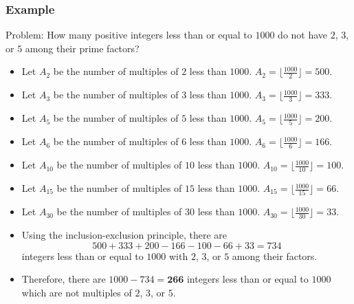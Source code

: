 \documentclass{beamer}
\begin{document}
\begin{frame}%
\frametitle{Example}

\scriptsize

\begin{mdframed}[style=exampledefault]
Problem: How many positive integers less than or equal to $1000$ do not have $2$, $3$, or $5$ among their
prime factors?
\end{mdframed}

\begin{itemize}

\item<2-> Let $A_2$ be the number of multiples of $2$ less than $1000$. $A_2 = \lfloor\frac{1000}{2}\rfloor = 500$.

\item<3-> Let $A_3$ be the number of multiples of $3$ less than $1000$. $A_3 = \lfloor\frac{1000}{3}\rfloor = 333$.

\item<4-> Let $A_5$ be the number of multiples of $5$ less than $1000$. $A_5 = \lfloor\frac{1000}{5}\rfloor = 200$.

\item<5-> Let $A_{6}$ be the number of multiples of $6$ less than $1000$. $A_6 = \lfloor\frac{1000}{6}\rfloor = 166$.

\item<6-> Let $A_{10}$ be the number of multiples of $10$ less than $1000$. $A_{10} = \lfloor\frac{1000}{10}\rfloor = 100$.

\item<7-> Let $A_{15}$ be the number of multiples of $15$ less than $1000$. $A_{15} = \lfloor\frac{1000}{15}\rfloor = 66$.

\item<8-> Let $A_{30}$ be the number of multiples of $30$ less than $1000$. $A_{30} = \lfloor\frac{1000}{30}\rfloor = 33$.

\item<9-> Using the inclusion-exclusion principle, there are
$$
500 + 333 + 200 - 166 - 100 - 66 + 33 = 734
$$
integers less than or equal to $1000$ with $2$, $3$, or $5$ among their factors.

\item<10-> Therefore, there are $1000 - 734 = \textbf{266}$ integers less than or equal to $1000$ which are not multiples of $2$, $3$, or $5$.

\end{itemize}

\end{frame}
\end{document}
